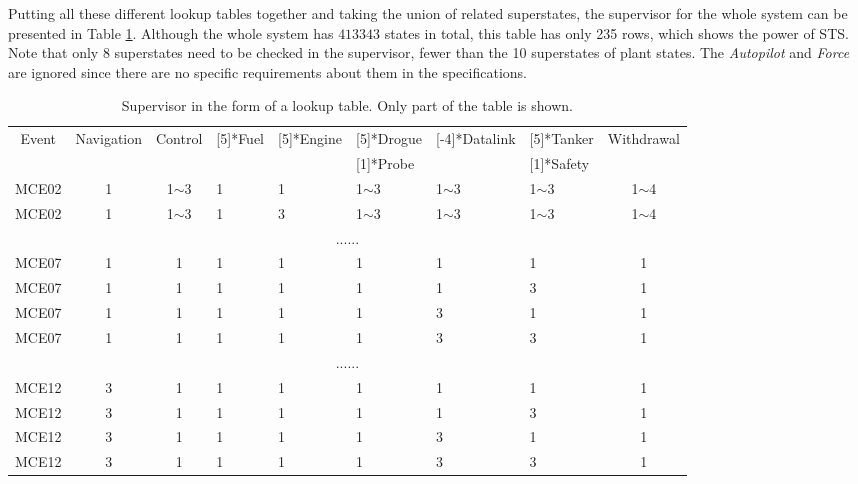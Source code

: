 Putting all these different lookup tables together and taking the union  of related superstates, the supervisor for the whole system can be presented in Table \ref{tab:supervisor}. Although the whole system has $ 413343 $ states in total, this table has only 235 rows, which shows the power of STS. Note that only 8 superstates need to be checked in the supervisor, fewer than the 10 superstates of plant states. The \textit{Autopilot} and \textit{Force} are ignored since there are no specific requirements about them in the specifications.

\begin{table}[!htbp]
	\centering
	\caption{Supervisor in the form of a lookup table. Only part of the table is shown.}
	\label{tab:supervisor}
	\begin{threeparttable}
		\begin{tabular}{|c|c|c|>{\hfil}p{30pt}<{\hfil}|>{\hfil}p{30pt}<{\hfil}|>{\hfil}p{30pt}<{\hfil}|>{\hfil}p{30pt}<{\hfil}|>{\hfil}p{30pt}<{\hfil}|c|}
			\hline
			\multirow{2}[5]{*}{Event} & \multirow{2}[5]{*}{Navigation} & \multirow{2}[5]{*}{Control\tnote{2}} & \multirow{2}[5]{*}{Fuel} & \multirow{2}[5]{*}{Engine} & \multirow{1}[5]{*}{Drogue} & \multirow{2}[-4]{*}{Datalink} & \multirow{1}[5]{*}{Tanker} & \multirow{2}[5]{*}{Withdrawal}\\
			& & & & & \multirow{1}[1]{*}{Probe} & & \multirow{1}[1]{*}{Safety} & \\ \hline
			MCE02 & 1 & 1$\sim$3 & 1 & 1 & 1$\sim$3 & 1$\sim$3 & 1$\sim$3 & 1$\sim$4 \\ \hline
			MCE02 & 1 & 1$\sim$3 & 1 & 3 & 1$\sim$3 & 1$\sim$3 & 1$\sim$3 & 1$\sim$4 \\ \hline
			\multicolumn{9}{|c|}{......} \\ \hline
			MCE07 & 1 & 1 & 1 & 1 & 1 & 1 & 1 & 1 \\ \hline
			MCE07 & 1 & 1 & 1 & 1 & 1 & 1 & 3 & 1 \\ \hline
			MCE07 & 1 & 1 & 1 & 1 & 1 & 3 & 1 & 1 \\ \hline
			MCE07 & 1 & 1 & 1 & 1 & 1 & 3 & 3 & 1 \\ \hline
			\multicolumn{9}{|c|}{......} \\ \hline
			MCE12 & 3 & 1 & 1 & 1 & 1 & 1 & 1 & 1 \\ \hline
			MCE12 & 3 & 1 & 1 & 1 & 1 & 1 & 3 & 1 \\ \hline
			MCE12 & 3 & 1 & 1 & 1 & 1 & 3 & 1 & 1 \\ \hline
			MCE12 & 3 & 1 & 1 & 1 & 1 & 3 & 3 & 1 \\ \hline

\end{tabular}
\end{threeparttable}
\end{table}
